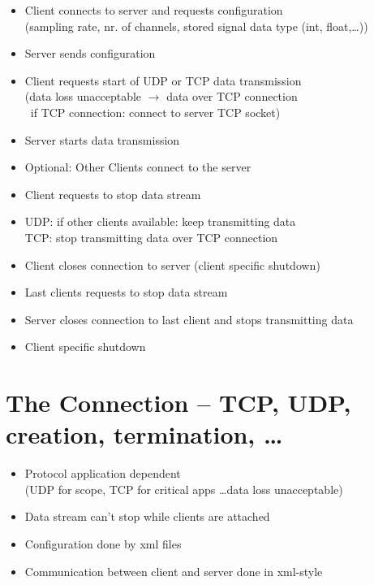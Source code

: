 \documentclass[11pt]{scrartcl}
\begin{document}
  \begin{itemize}
    \item Client connects to server and requests configuration\\
      \hspace*{0.2cm} (sampling rate, nr. of channels, stored signal data type (int, float,\dots))
    \item Server sends configuration
    \item Client requests start of UDP or TCP data transmission\\
      \hspace*{0.2cm} (data loss unacceptable $\rightarrow$  data over TCP connection\\
      \hspace*{0.2cm} ~if TCP connection: connect to server TCP socket)
    \item Server starts data transmission
    \newline
    \item Optional: Other Clients connect to the server
    \newline
    \item Client requests to stop data stream
    \item UDP: if other clients available: keep transmitting data\\
          TCP: stop transmitting data over TCP connection
    \item Client closes connection to server (client specific shutdown)
    \item Last clients requests to stop data stream
    \item Server closes connection to last client and stops transmitting data
    \item Client specific shutdown
  \end{itemize}

\section{The Connection -- TCP, UDP, creation, termination, \dots}

  \begin{itemize}
    \item Protocol application dependent\\
      \quad (UDP for scope, TCP for critical apps \dots data loss unacceptable)
    \item Data stream can't stop while clients are attached
    \item Configuration done by xml files
    \item Communication between client and server done in xml-style
  \end{itemize}
\end{document}
